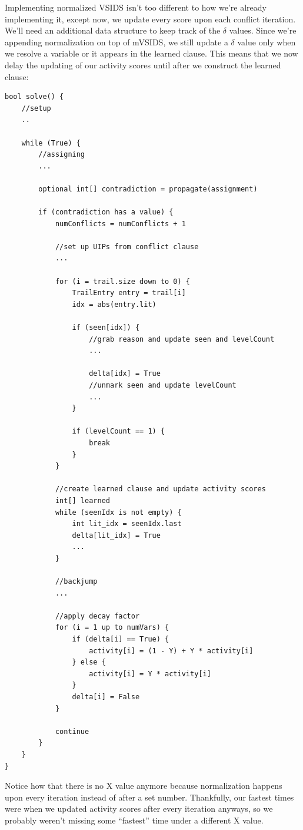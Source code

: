\documentclass[oneside]{book}
\begin{document}
Implementing normalized VSIDS isn't too different to how we're already implementing it,
except now, we update every score upon each conflict iteration. We'll need an additional 
data structure to keep track of the $\delta$ values. Since we're appending normalization 
on top of mVSIDS, we still update a $\delta$ value only when we resolve a variable or it 
appears in the learned clause. This means that we now delay the updating of our activity 
scores until after we construct the learned clause:
\begin{lstlisting}
bool solve() {
    //setup
    ..

    while (True) {
        //assigning
        ...

        optional int[] contradiction = propagate(assignment)

        if (contradiction has a value) {
            numConflicts = numConflicts + 1

            //set up UIPs from conflict clause
            ...

            for (i = trail.size down to 0) {
                TrailEntry entry = trail[i]
                idx = abs(entry.lit)

                if (seen[idx]) {
                    //grab reason and update seen and levelCount
                    ...

                    delta[idx] = True
                    //unmark seen and update levelCount
                    ...
                }

                if (levelCount == 1) {
                    break
                }
            }

            //create learned clause and update activity scores
            int[] learned
            while (seenIdx is not empty) {
                int lit_idx = seenIdx.last
                delta[lit_idx] = True
                ...
            }

            //backjump
            ...

            //apply decay factor
            for (i = 1 up to numVars) {
                if (delta[i] == True) {
                    activity[i] = (1 - Y) + Y * activity[i]
                } else {
                    activity[i] = Y * activity[i]
                }
                delta[i] = False
            }

            continue
        }
    }
}
\end{lstlisting}
\noindent
Notice how that there is no X value anymore because normalization happens upon 
every iteration instead of after a set number. Thankfully, our fastest times were 
when we updated activity scores after every iteration anyways, so we probably weren't 
missing some ``fastest'' time under a different X value.
\end{document}
